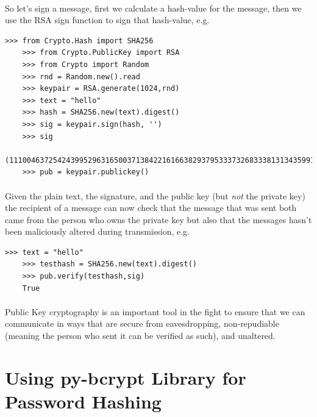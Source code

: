 \documentclass[12pt, a4paper, twoside]{book}
\begin{document}
\paragraph{} So let's sign a message, first we calculate a hash-value for the message, then we use the RSA sign function to sign that hash-value, e.g.

\begin{lstlisting}[style=DOS]
    >>> from Crypto.Hash import SHA256
    >>> from Crypto.PublicKey import RSA
    >>> from Crypto import Random
    >>> rnd = Random.new().read
    >>> keypair = RSA.generate(1024,rnd)
    >>> text = "hello"
    >>> hash = SHA256.new(text).digest()
    >>> sig = keypair.sign(hash, '')
    >>> sig
    (111004637254243995296316500371384221616638293795333732683338131343599162464689495396310140992877093588050236570061389234822100924372155041895989651044833066627302857544152750773907374436456744979379429396104023571661485474683753194948844081967875024033289332359776882595360104731737542292364224609629748624699L,)
    >>> pub = keypair.publickey()
\end{lstlisting}

\paragraph{} Given the plain text, the signature, and the public key (but \emph{not} the private key) the recipient of a message can now check that the message that was sent both came from the person who owns the private key but also that the messages hasn't been maliciously altered during transmission, e.g.

\begin{lstlisting}[style=DOS]
    >>> text = "hello"
    >>> testhash = SHA256.new(text).digest()
    >>> pub.verify(testhash,sig)
    True
\end{lstlisting}

\paragraph{} Public Key cryptography is an important tool in the fight to ensure that we can communicate in ways that are secure from eavesdropping, non-repudiable (meaning the person who sent it can be verified as such), and unaltered.

\section{Using py-bcrypt Library for Password Hashing}
\label{py-bcrypt}
\end{document}
